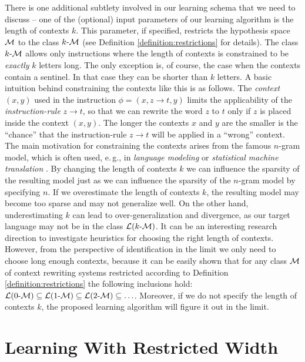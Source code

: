 There is one additional subtlety involved in our learning schema that we need to discuss -- one of the (optional) input parameters of our learning algorithm is the length of contexts $k$. This parameter, if specified, restricts the hypothesis space $\calM$ to the class $\kcalM$ (see Definition \ref{definition:restrictions} for details). The class  $\kcalM$ allows only instructions where the length of contexts is constrained to be \emph{exactly} $k$ letters long. The only exception is, of course, the case when the contexts contain a sentinel. In that case they can be shorter than $k$ letters. A basic intuition behind constraining the contexts like this is as follows. The \emph{context} $(x, y)$ used in the instruction $\phi = (x, z \to t, y)$ limits the applicability of the \emph{instruction-rule} $z \to t$, so that we can rewrite the word $z$ to $t$ only if $z$ is placed inside the context $(x, y)$. The longer the contexts $x$ and $y$ are the smaller is the ``chance'' that the instruction-rule $z \to t$ will be applied in a ``wrong'' context. The main motivation for constraining the contexts arises from the famous $n$-gram model, which is often used, e.\,g., in \emph{language modeling} or \emph{statistical machine translation} \citep{Jurafsky}. By changing the length of contexts $k$ we can influence the sparsity of the resulting model just as we can influence the sparsity of the $n$-gram model by specifying $n$. If we overestimate the length of contexts $k$, the resulting model may become too sparse and may not generalize well. On the other hand, underestimating $k$ can lead to over-generalization and divergence, as our target language may not be in the class $\calL{\kcalM}$. It can be an interesting research direction to investigate heuristics for choosing the right length of contexts. However, from the perspective of identification in the limit we only need to choose long enough contexts, because it can be easily shown that for any class $\calM$ of context rewriting systems restricted according to Definition \ref{definition:restrictions} the following inclusions hold: $\calL{\kcalM[0]} \subseteq \calL{\kcalM[1]} \subseteq \calL{\kcalM[2]} \subseteq \ldots$. Moreover, if we do not specify the length of contexts $k$, the proposed learning algorithm will figure it out in the limit.

\section{Learning With Restricted Width}\label{section:restricted-learning}

